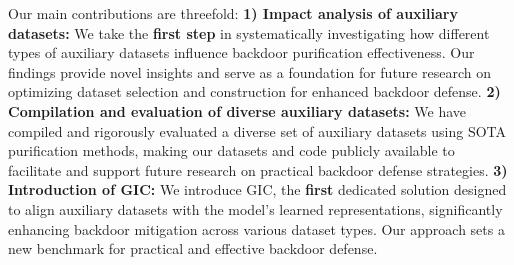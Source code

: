 Our main contributions are threefold:
\textbf{1) Impact analysis of auxiliary datasets:} We take the \textbf{first step}  in systematically investigating how different types of auxiliary datasets influence backdoor purification effectiveness. Our findings provide novel insights and serve as a foundation for future research on optimizing dataset selection and construction for enhanced backdoor defense.
%
\textbf{2) Compilation and evaluation of diverse auxiliary datasets:}  We have compiled and rigorously evaluated a diverse set of auxiliary datasets using SOTA purification methods, making our datasets and code publicly available to facilitate and support future research on practical backdoor defense strategies.
%
\textbf{3) Introduction of GIC:} We introduce GIC, the \textbf{first} dedicated solution designed to align auxiliary datasets with the model’s learned representations, significantly enhancing backdoor mitigation across various dataset types. Our approach sets a new benchmark for practical and effective backdoor defense.


